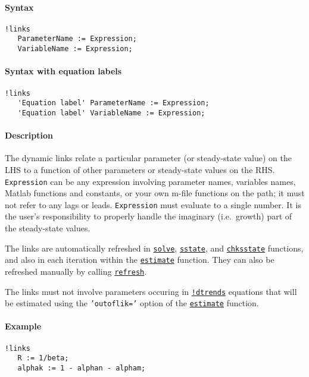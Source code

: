 


	\paragraph{Syntax}\label{syntax}

\begin{verbatim}
!links
   ParameterName := Expression;
   VariableName := Expression;
\end{verbatim}

\paragraph{Syntax with equation
labels}\label{syntax-with-equation-labels}

\begin{verbatim}
!links
   'Equation label' ParameterName := Expression;
   'Equation label' VariableName := Expression;
\end{verbatim}

\paragraph{Description}\label{description}

The dynamic links relate a particular parameter (or steady-state value)
on the LHS to a function of other parameters or steady-state values on
the RHS. \texttt{Expression} can be any expression involving parameter
names, variables names, Matlab functions and constants, or your own
m-file functions on the path; it must not refer to any lags or leads.
\texttt{Expression} must evaluate to a single number. It is the user's
responsibility to properly handle the imaginary (i.e.~growth) part of
the steady-state values.

The links are automatically refreshed in
\href{model/solve}{\texttt{solve}},
\href{model/sstate}{\texttt{sstate}}, and
\href{model/chksstate}{\texttt{chksstate}} functions, and also in each
iteration within the \href{model/estimate}{\texttt{estimate}} function.
They can also be refreshed manually by calling
\href{model/refresh}{\texttt{refresh}}.

The links must not involve parameters occuring in
\href{modellang/dtrends}{\texttt{!dtrends}} equations that will be
estimated using the \texttt{'outoflik='} option of the
\href{model/estimate}{\texttt{estimate}} function.

\paragraph{Example}\label{example}

\begin{verbatim}
!links
   R := 1/beta;
   alphak := 1 - alphan - alpham;
\end{verbatim}


